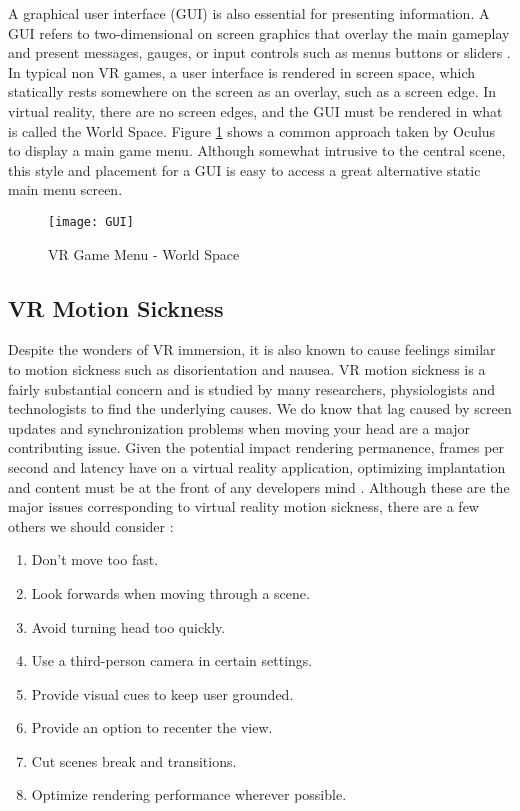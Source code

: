 \par A graphical user interface (GUI) is also essential for presenting information. A GUI refers to two-dimensional on screen graphics that overlay the main gameplay and present messages, gauges, or input controls such as menus buttons or sliders \cite{linowes}. In typical non VR games, a user interface is rendered in screen space, which statically rests somewhere on the screen as an overlay, such as a screen edge. In virtual reality, there are no screen edges, and the GUI must be rendered in what is called the World Space. Figure \ref{fig:GUI} shows a common approach taken by Oculus to display a main game menu. Although somewhat intrusive to the central scene, this style and placement for a GUI is easy to access a great alternative static main menu screen.

\begin{figure}[h]
	\centering
	\texttt{[image: GUI]}
	\caption{VR Game Menu - World Space \cite{GUI}}
	\label{fig:GUI}
\end{figure}




\subsection{VR Motion Sickness}

Despite the wonders of VR immersion, it is also known to cause feelings similar to motion sickness such as disorientation and nausea. VR motion sickness is a fairly substantial concern and is studied by many researchers, physiologists and technologists to find the underlying causes. We do know that lag caused by screen updates and synchronization problems when moving your head are a major contributing issue.
Given the potential impact rendering permanence, frames per second and latency have on a virtual reality application, optimizing implantation and content must be at the front of any developers mind \cite{gobbetti}. 
Although these are the major issues corresponding to virtual reality motion sickness, there are a few others we should consider \cite{linowes}:

\begin{enumerate}
	\item Don't move too fast.
	\item Look forwards when moving through a scene.
	\item Avoid turning head too quickly.
	\item Use a third-person camera in certain settings.
	\item Provide visual cues to keep user grounded.
	\item Provide an option to recenter the view.
	\item Cut scenes break and transitions.
	\item Optimize rendering performance wherever possible.
\end{enumerate}

